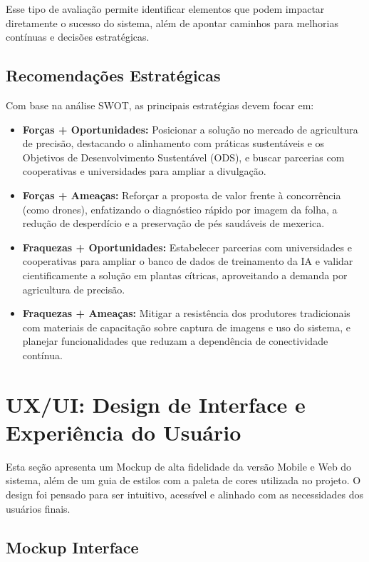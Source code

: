 \documentclass[11pt,a4paper]{article}
\begin{document}
\medskip
Esse tipo de avaliação permite identificar elementos que podem impactar diretamente o sucesso do sistema, além de apontar caminhos para melhorias contínuas e decisões estratégicas.

\subsection{Recomendações Estratégicas}

Com base na análise SWOT, as principais estratégias devem focar em:
\begin{itemize}
    \item \textbf{Forças + Oportunidades:} Posicionar a solução no mercado de agricultura de precisão, destacando o alinhamento com práticas sustentáveis e os Objetivos de Desenvolvimento Sustentável (ODS), e buscar parcerias com cooperativas e universidades para ampliar a divulgação.
    \item \textbf{Forças + Ameaças:} Reforçar a proposta de valor frente à concorrência (como drones), enfatizando o diagnóstico rápido por imagem da folha, a redução de desperdício e a preservação de pés saudáveis de mexerica.
    \item \textbf{Fraquezas + Oportunidades:} Estabelecer parcerias com universidades e cooperativas para ampliar o banco de dados de treinamento da IA e validar cientificamente a solução em plantas cítricas, aproveitando a demanda por agricultura de precisão.
    \item \textbf{Fraquezas + Ameaças:} Mitigar a resistência dos produtores tradicionais com materiais de capacitação sobre captura de imagens e uso do sistema, e planejar funcionalidades que reduzam a dependência de conectividade contínua.
\end{itemize}

\section{UX/UI: Design de Interface e Experiência do Usuário}

Esta seção apresenta um Mockup de alta fidelidade da versão Mobile e Web do sistema, além de 
um guia de estilos com a paleta de cores utilizada no projeto. 
O design foi pensado para ser intuitivo, acessível e alinhado com as necessidades dos usuários 
finais.

\subsection{Mockup Interface}
\end{document}
